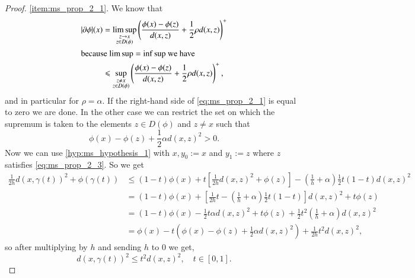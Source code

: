 \documentclass[a4paper,11pt, leqno]{scrreprt} %
\renewcommand{\leq}{\leqslant}
\renewcommand{\leq}{\leqslant}
\theoremstyle{change}
\theoremstyle{nonumberplain}
\newtheorem{proof}{Proof}
\begin{document}
\begin{proof}
  \ref{item:ms_prop_2_1}. We know that
  \begin{equation}
    \label{eq:ms_prop_2_2}
    \begin{split}
      |\partial \phi|(x) &= \limsup_{\substack{z \to x\\ z \in
          D(\phi)}} \left (\frac{\phi(x) - \phi(z)}{d(x,z)} + \frac12
        \rho d(x, z) \right )^+\\
      \shortintertext{because $\limsup = \inf \sup$ we have}
      &\leq \sup_{\substack{z \neq x\\ z \in D(\phi)}} \left (\frac{\phi(x) - \phi(z)}{d(x,z)} + \frac12
        \rho d(x, z) \right )^+,
    \end{split}
  \end{equation}
  and in particular for $\rho = \alpha$. If the right-hand side of
  \eqref{eq:ms_prop_2_1} is equal to zero we are done. In the other
  case we can restrict the set on which the supremum is taken to the
  elements $z \in D(\phi)$ and $z \neq x$ such that
  \begin{equation}
    \label{eq:ms_prop_2_3}
    \phi(x) - \phi(z) + \frac12 \alpha d(x, z)^2 > 0.
  \end{equation}
  Now we can use \ref{hyp:ms_hypothesis_1} with $x, y_0 := x$ and $y_1
  := z$ where $z$ satisfies \eqref{eq:ms_prop_2_3}. So we get
  \begin{equation}
    \label{eq:ms_prop_2_4}
    \begin{split}
      \frac1{2h} d(x, \gamma(t))^2 + \phi(\gamma(t)) &\leq (1 - t)
      \phi(x) + t \left [ \frac1{2h} d(x, z)^2 + \phi(z) \right ] -
      \left ( \frac1h + \alpha \right ) \frac12 t (1 - t) d(x, z)^2\\
      &=(1 - t) \phi(x) + \left [ \frac1{2h} t - \left ( \frac1h +
          \alpha \right )\frac12 t(1 - t) \right ] d(x, z)^2 + t
      \phi(z)\\
      &= (1 - t) \phi(x) - \frac12 t \alpha d(x, z)^2 + t \phi(z) +
      \frac12 t^2 \left ( \frac1h + \alpha \right ) d(x, z)^2\\
      &= \phi(x) - t (\phi(x) - \phi(z) + \frac12 \alpha d(x, z)^2 ) +
      \frac1{2h} t^2 d(x, z)^2,
    \end{split}
  \end{equation}
  so after multiplying by $h$ and sending $h$ to $0$ we get,
  \begin{equation}
    \label{eq:ms_prop_2_5}
    d(x, \gamma(t))^2 \leq t^2 d(x, z)^2, \quad t \in [0,1].
  \end{equation}

\end{proof}
\end{document}
